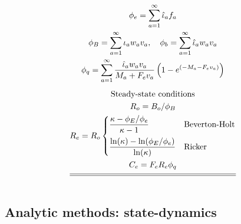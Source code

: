 \begin{multicols}{2}
\begin{tablehere}
\begin{gather}
            \phi_e=\sum_{a=1}^\infty \hat{\iota}_a f_a          \label{T2.10}\\
            \phi_B=\sum_{a=1}^\infty \iota_a w_a v_a, \quad
            \phi_b=\sum_{a=1}^\infty \hat{\iota}_a w_a v_a      \label{T2.11}\\
            \phi_q=\sum_{a=1}^\infty
                \frac{ \hat{\iota}_a w_a v_a}{M_a+F_ev_a}
                \left(1-e^{(-M_a-F_ev_a)}\right)                \label{T2.11b}\\[1ex]
        \mbox{Steady-state conditions} \nonumber \\
            R_o=B_o/ \phi_B                                     \label{T2.12}\\
            R_e=R_o\begin{cases}
            \dfrac{\kappa-\phi_E/\phi_e}{\kappa-1}&\mbox{Beverton-Holt}\\[2ex]
            \dfrac{\ln(\kappa)-\ln(\phi_E/\phi_e)}{\ln(\kappa)}& \mbox{Ricker}
            \end{cases}                                         \label{T2.13}\\
            C_e=F_e R_e \phi_q                                  \label{T2.14}\\[1ex]
        \hline \hline \nonumber
    \end{gather}
    \normalEq
\end{tablehere}
 





\end{multicols}




\subsection{Analytic methods: state-dynamics} %
\label{sub:analytic_methods_state_dynamics}


